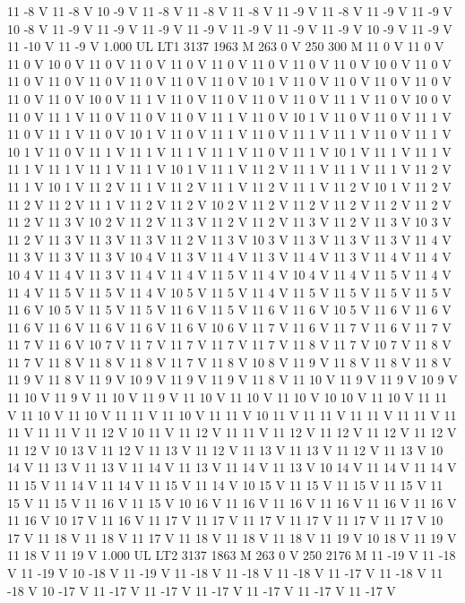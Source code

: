{11 -8 V
11 -8 V
10 -9 V
11 -8 V
11 -8 V
11 -8 V
11 -9 V
11 -8 V
11 -9 V
11 -9 V
10 -8 V
11 -9 V
11 -9 V
11 -9 V
11 -9 V
11 -9 V
11 -9 V
11 -9 V
10 -9 V
11 -9 V
11 -10 V
11 -9 V
1.000 UL
LT1
3137 1963 M
263 0 V
250 300 M
11 0 V
11 0 V
11 0 V
10 0 V
11 0 V
11 0 V
11 0 V
11 0 V
11 0 V
11 0 V
11 0 V
10 0 V
11 0 V
11 0 V
11 0 V
11 0 V
11 0 V
11 0 V
11 0 V
10 1 V
11 0 V
11 0 V
11 0 V
11 0 V
11 0 V
11 0 V
10 0 V
11 1 V
11 0 V
11 0 V
11 0 V
11 0 V
11 1 V
11 0 V
10 0 V
11 0 V
11 1 V
11 0 V
11 0 V
11 0 V
11 1 V
11 0 V
10 1 V
11 0 V
11 0 V
11 1 V
11 0 V
11 1 V
11 0 V
10 1 V
11 0 V
11 1 V
11 0 V
11 1 V
11 1 V
11 0 V
11 1 V
10 1 V
11 0 V
11 1 V
11 1 V
11 1 V
11 1 V
11 0 V
11 1 V
10 1 V
11 1 V
11 1 V
11 1 V
11 1 V
11 1 V
11 1 V
10 1 V
11 1 V
11 2 V
11 1 V
11 1 V
11 1 V
11 2 V
11 1 V
10 1 V
11 2 V
11 1 V
11 2 V
11 1 V
11 2 V
11 1 V
11 2 V
10 1 V
11 2 V
11 2 V
11 2 V
11 1 V
11 2 V
11 2 V
10 2 V
11 2 V
11 2 V
11 2 V
11 2 V
11 2 V
11 2 V
11 3 V
10 2 V
11 2 V
11 3 V
11 2 V
11 2 V
11 3 V
11 2 V
11 3 V
10 3 V
11 2 V
11 3 V
11 3 V
11 3 V
11 2 V
11 3 V
10 3 V
11 3 V
11 3 V
11 3 V
11 4 V
11 3 V
11 3 V
11 3 V
10 4 V
11 3 V
11 4 V
11 3 V
11 4 V
11 3 V
11 4 V
11 4 V
10 4 V
11 4 V
11 3 V
11 4 V
11 4 V
11 5 V
11 4 V
10 4 V
11 4 V
11 5 V
11 4 V
11 4 V
11 5 V
11 5 V
11 4 V
10 5 V
11 5 V
11 4 V
11 5 V
11 5 V
11 5 V
11 5 V
11 6 V
10 5 V
11 5 V
11 5 V
11 6 V
11 5 V
11 6 V
11 6 V
10 5 V
11 6 V
11 6 V
11 6 V
11 6 V
11 6 V
11 6 V
11 6 V
10 6 V
11 7 V
11 6 V
11 7 V
11 6 V
11 7 V
11 7 V
11 6 V
10 7 V
11 7 V
11 7 V
11 7 V
11 7 V
11 8 V
11 7 V
10 7 V
11 8 V
11 7 V
11 8 V
11 8 V
11 8 V
11 7 V
11 8 V
10 8 V
11 9 V
11 8 V
11 8 V
11 8 V
11 9 V
11 8 V
11 9 V
10 9 V
11 9 V
11 9 V
11 8 V
11 10 V
11 9 V
11 9 V
10 9 V
11 10 V
11 9 V
11 10 V
11 9 V
11 10 V
11 10 V
11 10 V
10 10 V
11 10 V
11 11 V
11 10 V
11 10 V
11 11 V
11 10 V
11 11 V
10 11 V
11 11 V
11 11 V
11 11 V
11 11 V
11 11 V
11 12 V
10 11 V
11 12 V
11 11 V
11 12 V
11 12 V
11 12 V
11 12 V
11 12 V
10 13 V
11 12 V
11 13 V
11 12 V
11 13 V
11 13 V
11 12 V
11 13 V
10 14 V
11 13 V
11 13 V
11 14 V
11 13 V
11 14 V
11 13 V
10 14 V
11 14 V
11 14 V
11 15 V
11 14 V
11 14 V
11 15 V
11 14 V
10 15 V
11 15 V
11 15 V
11 15 V
11 15 V
11 15 V
11 16 V
11 15 V
10 16 V
11 16 V
11 16 V
11 16 V
11 16 V
11 16 V
11 16 V
10 17 V
11 16 V
11 17 V
11 17 V
11 17 V
11 17 V
11 17 V
11 17 V
10 17 V
11 18 V
11 18 V
11 17 V
11 18 V
11 18 V
11 18 V
11 19 V
10 18 V
11 19 V
11 18 V
11 19 V
1.000 UL
LT2
3137 1863 M
263 0 V
250 2176 M
11 -19 V
11 -18 V
11 -19 V
10 -18 V
11 -19 V
11 -18 V
11 -18 V
11 -18 V
11 -17 V
11 -18 V
11 -18 V
10 -17 V
11 -17 V
11 -17 V
11 -17 V
11 -17 V
11 -17 V
11 -17 V
}

